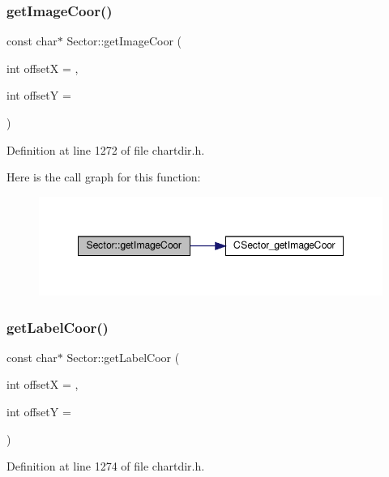 \subsubsection{\texorpdfstring{get\+Image\+Coor()}{getImageCoor()}}
{\footnotesize\ttfamily const char$\ast$ Sector\+::get\+Image\+Coor (\begin{DoxyParamCaption}\item[{int}]{offsetX = {},  }\item[{int}]{offsetY = {} }\end{DoxyParamCaption})\hspace{0.3cm}{\ttfamily [inline]}}



Definition at line 1272 of file chartdir.\+h.

Here is the call graph for this function\+:
\nopagebreak
\begin{figure}[H]
\begin{center}
\leavevmode
\includegraphics[width=348pt]{class_sector_a1633502a6429c3dd568b74c9c1927d09_cgraph}
\end{center}
\end{figure}
\mbox{\label{class_sector_adb9923715403a28445bfffb77a4e05a1}} 
\subsubsection{\texorpdfstring{get\+Label\+Coor()}{getLabelCoor()}}
{\footnotesize\ttfamily const char$\ast$ Sector\+::get\+Label\+Coor (\begin{DoxyParamCaption}\item[{int}]{offsetX = {},  }\item[{int}]{offsetY = {} }\end{DoxyParamCaption})\hspace{0.3cm}{\ttfamily [inline]}}



Definition at line 1274 of file chartdir.\+h.

